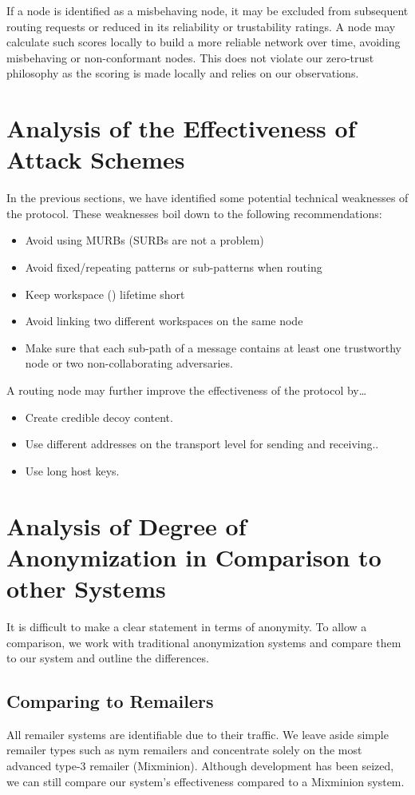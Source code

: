 If a node is identified as a misbehaving node, it may be excluded from subsequent routing requests or reduced in its reliability or trustability ratings. A node may calculate such scores locally to build a more reliable network over time, avoiding misbehaving or non-conformant nodes. This does not violate our zero-trust philosophy as the scoring is made locally and relies on our observations.


\chapter{Analysis of the Effectiveness of Attack Schemes}
In the previous sections, we have identified some potential technical weaknesses of the protocol. These weaknesses boil down to the following recommendations:
\begin{itemize}
	\item Avoid using MURBs (SURBs are not a problem)
	\item Avoid fixed/repeating patterns or sub-patterns when routing
	\item Keep workspace () lifetime short
	\item Avoid linking two different workspaces on the same node
	\item Make sure that each sub-path of a message contains at least one trustworthy node or two non-collaborating adversaries.
\end{itemize}

A routing node may further improve the effectiveness of the protocol by\ldots

\begin{itemize}
	\item Create credible decoy content.
	\item Use different addresses on the transport level for sending and receiving..
	\item Use long host keys.
\end{itemize}

\chapter[Degree of Anonymization in Comparison]{Analysis of Degree of Anonymization \MessageVortex{} in Comparison to other Systems}
It is difficult to make a clear statement in terms of anonymity. To allow a comparison, we work with traditional anonymization systems and compare them to our system and outline the differences. 

\section{Comparing \MessageVortex{} to Remailers}
All remailer systems are identifiable due to their traffic.  We leave aside simple remailer types such as nym remailers and concentrate solely on the most advanced type-3 remailer (Mixminion). Although development has been seized, we can still compare our system's effectiveness compared to a Mixminion system.

